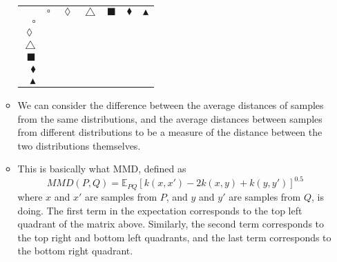 \documentclass{article}
\begin{document}
\begin{itemize}
\begin{itemize}
		\begin{center}
			\begin{tabular}{ rcccccc }
				\multicolumn{1}{r}{}
				&  \multicolumn{1}{c}{$\square$}
				& \multicolumn{1}{c}{$\lozenge$}
				& \multicolumn{1}{c}{$\triangle$}
				& \multicolumn{1}{c}{$\blacksquare$}
				& \multicolumn{1}{c}{$\blacklozenge$}
				& \multicolumn{1}{c}{$\blacktriangle$} \\
				$\square$ & \cellcolor{black!5} & \cellcolor{black!5} & \cellcolor{black!5} & \cellcolor{black!30} & \cellcolor{black!30} & \cellcolor{black!30} \\
				$\lozenge$ & \cellcolor{black!5} & \cellcolor{black!5} & \cellcolor{black!5} & \cellcolor{black!30} & \cellcolor{black!30} & \cellcolor{black!30} \\
				$\triangle$ & \cellcolor{black!5} & \cellcolor{black!5} & \cellcolor{black!5} & \cellcolor{black!30} & \cellcolor{black!30} & \cellcolor{black!30} \\
				$\blacksquare$ & \cellcolor{black!30} & \cellcolor{black!30} & \cellcolor{black!30} & \cellcolor{black!10} & \cellcolor{black!10} & \cellcolor{black!10} \\
				$\blacklozenge$ & \cellcolor{black!30} & \cellcolor{black!30} & \cellcolor{black!30} & \cellcolor{black!10} & \cellcolor{black!10} & \cellcolor{black!10} \\
				$\blacktriangle$ & \cellcolor{black!30} & \cellcolor{black!30} & \cellcolor{black!30} & \cellcolor{black!10} & \cellcolor{black!10} & \cellcolor{black!10} \\
			\end{tabular}
		\end{center}
	
		\item We can consider the difference between the average distances of samples from the same distributions, and the average distances between samples from different distributions to be a measure of the distance between the two distributions themselves. 
		
		\item This is basically what MMD, defined as
		\begin{equation}
		MMD(P,Q) = \mathbb{E}_{PQ}[k(x,x') - 2k(x,y) + k(y,y')]^{0.5}
		\end{equation}
		where $x$ and $x'$ are samples from $P$, and $y$ and $y'$ are samples from $Q$, is doing. The first term in the expectation corresponds to the top left quadrant of the matrix above. Similarly, the second term corresponds to the top right and bottom left quadrants, and the last term corresponds to the bottom right quadrant. 
		
	\end{itemize}	
\end{itemize}
\end{document}
